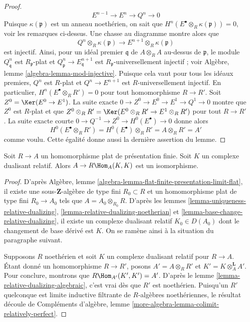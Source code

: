 \begin{proof}
$$
E^{n - 1} \to E^n \to Q^n \to 0
$$
Puisque $\kappa(\mathfrak p)$ est un anneau noethérien, on sait que $H^n(E^\bullet \otimes_R \kappa(\mathfrak p)) = 0$,
voir les remarques ci-dessus. Une chasse au diagramme montre alors que
$$
Q^n \otimes_R \kappa(\mathfrak p) \to E^{n + 1} \otimes_R \kappa(\mathfrak p)
$$
est injectif. Ainsi, pour un idéal premier $\mathfrak q$ de $A \otimes_R A$
au-dessus de $\mathfrak p$, le module $Q^n_\mathfrak q$ est $R_\mathfrak p$-plat
et $Q^n_\mathfrak p \to E^{n + 1}_\mathfrak q$ est $R_\mathfrak p$-universellement injectif ; voir Algèbre, lemme \ref{algebra-lemma-mod-injective}.
Puisque cela vaut pour tous les idéaux premiers,
$Q^n$ est $R$-plat et $Q^n \to E^{n + 1}$ est $R$-universellement injectif.
En particulier, $H^n(E^\bullet \otimes_R R') = 0$ pour tout homomorphisme $R \to R'$.
Soit $Z^0 = \Ker(E^0 \to E^1)$. La suite exacte $0 \to Z^0 \to E^0 \to E^1 \to Q^1 \to 0$ montre que $Z^0$ est $R$-plat et que
$Z^0 \otimes_R R' = \Ker(E^0 \otimes_R R' \to E^1 \otimes_R R')$
pour tout $R \to R'$. La suite exacte courte
$0 \to Q^{-1} \to Z^0 \to H^0(E^\bullet) \to 0$
donne alors
$$
H^0(E^\bullet \otimes_R R') = H^0(E^\bullet) \otimes_R R'
= A \otimes_R R' = A'
$$
comme voulu. Cette égalité donne aussi la dernière assertion du lemme.
\end{proof}

\begin{lemma}
\label{lemma-relative-dualizing-RHom}
Soit $R \to A$ un homomorphisme plat de présentation finie.
Soit $K$ un complexe dualisant relatif.
Alors $A \to R\Hom_A(K, K)$ est un isomorphisme.
\end{lemma}

\begin{proof}
D'après Algèbre, lemme \ref{algebra-lemma-flat-finite-presentation-limit-flat}, il existe une sous-$\mathbf{Z}$-algèbre de type fini
$R_0 \subset R$ et un homomorphisme plat de type fini $R_0 \to A_0$ tels que $A = A_0 \otimes_{R_0} R$.
D'après les lemmes \ref{lemma-uniqueness-relative-dualizing}, \ref{lemma-relative-dualizing-noetherian} et \ref{lemma-base-change-relative-dualizing},
il existe un complexe dualisant relatif $K_0 \in D(A_0)$
dont le changement de base dérivé est $K$.
On se ramène ainsi à la situation du paragraphe suivant.

\medskip\noindent
Supposons $R$ noethérien et soit $K$ un complexe dualisant relatif pour $R \to A$.
Étant donné un homomorphisme $R \to R'$, posons $A' = A \otimes_R R'$ et $K' = K \otimes_A^\mathbf{L} A'$.
Pour conclure, montrons que $R\Hom_{A'}(K', K') = A'$.
D'après le lemme \ref{lemma-relative-dualizing-algebraic}, c'est vrai dès que $R'$ est noethérien.
Puisqu'un $R'$ quelconque est limite inductive filtrante
de $R$-algèbres noethériennes, le résultat découle de
Compléments d'algèbre, lemme \ref{more-algebra-lemma-colimit-relatively-perfect}.
\end{proof}

